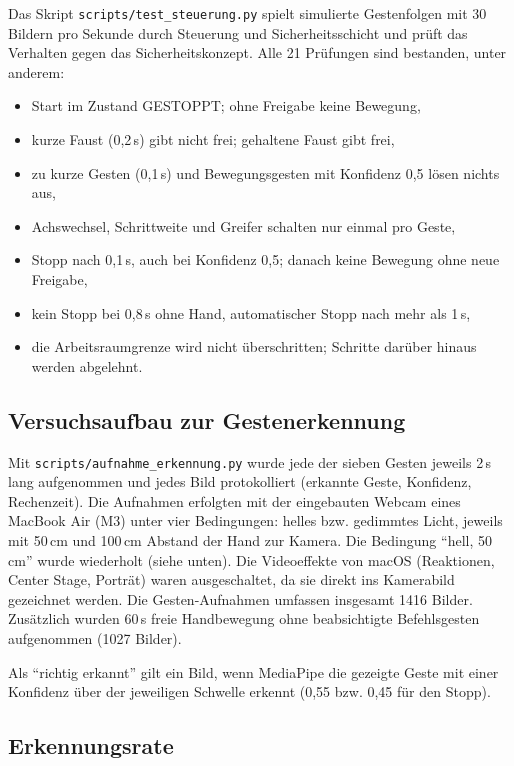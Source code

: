 \documentclass[11pt,a4paper]{article}
\newcommand{\datei}[1]{\texttt{#1}}
\begin{document}
Das Skript \datei{scripts/test\_steuerung.py} spielt simulierte Gestenfolgen mit 30 Bildern pro
Sekunde durch Steuerung und Sicherheitsschicht und prüft das Verhalten gegen das
Sicherheitskonzept. Alle 21 Prüfungen sind bestanden, unter anderem:
\begin{itemize}
  \item Start im Zustand GESTOPPT; ohne Freigabe keine Bewegung,
  \item kurze Faust (0,2\,s) gibt nicht frei; gehaltene Faust gibt frei,
  \item zu kurze Gesten (0,1\,s) und Bewegungsgesten mit Konfidenz 0,5 lösen nichts aus,
  \item Achswechsel, Schrittweite und Greifer schalten nur einmal pro Geste,
  \item Stopp nach 0,1\,s, auch bei Konfidenz 0,5; danach keine Bewegung ohne neue Freigabe,
  \item kein Stopp bei 0,8\,s ohne Hand, automatischer Stopp nach mehr als 1\,s,
  \item die Arbeitsraumgrenze wird nicht überschritten; Schritte darüber hinaus werden abgelehnt.
\end{itemize}

\subsection{Versuchsaufbau zur Gestenerkennung}

Mit \datei{scripts/aufnahme\_erkennung.py} wurde jede der sieben Gesten jeweils 2\,s lang
aufgenommen und jedes Bild protokolliert (erkannte Geste, Konfidenz, Rechenzeit). Die Aufnahmen
erfolgten mit der eingebauten Webcam eines MacBook Air (M3) unter vier Bedingungen: helles bzw.
gedimmtes Licht, jeweils mit 50\,cm und 100\,cm Abstand der Hand zur Kamera. Die Bedingung
\enquote{hell, 50\,cm} wurde wiederholt (siehe unten). Die Videoeffekte von macOS (Reaktionen,
Center Stage, Porträt) waren ausgeschaltet, da sie direkt ins Kamerabild gezeichnet werden.
Die Gesten-Aufnahmen umfassen insgesamt 1416 Bilder. Zusätzlich wurden 60\,s freie Handbewegung
ohne beabsichtigte Befehlsgesten aufgenommen (1027 Bilder).

Als \enquote{richtig erkannt} gilt ein Bild, wenn MediaPipe die gezeigte Geste mit einer Konfidenz
über der jeweiligen Schwelle erkennt (0,55 bzw. 0,45 für den Stopp).

\subsection{Erkennungsrate}
\end{document}

